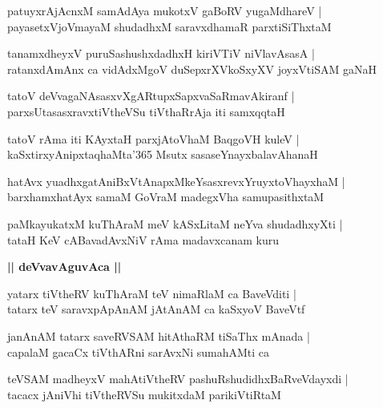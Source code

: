 \documentclass[twoside,12pt,openright]{book}
\newcounter{shloka}[chapter]
\def\uvaca#1{\centerline{{\large\textbf{#1}}}}
\begin{document}
\begin{shloka}%
patuyxrAjAcnxM samAdAya mukotxV gaBoRV yugaMdhareV |\\
payasetxVjoVmayaM shudadhxM saravxdhamaR parxtiSiThxtaM 
\end{shloka}

\begin{shloka}%
tanamxdheyxV puruSashushxdadhxH kiriVTiV niVlavAsasA |\\
ratanxdAmAnx ca vidAdxMgoV duSepxrXVkoSxyXV joyxVtiSAM gaNaH 
\end{shloka}

\begin{shloka}%
tatoV deVvagaNAsasxvXgARtupxSapxvaSaRmavAkiranf |\\
parxsUtasasxravxtiVtheVSu tiVthaRrAja iti samxqqtaH 
\end{shloka}

\begin{shloka}%
tatoV rAma iti KAyxtaH parxjAtoVhaM BaqgoVH kuleV |\\
kaSxtirxyAnipxtaqhaMta\char'365 Msutx sasaseYnayxbalavAhanaH 
\end{shloka}

\begin{shloka}%
hatAvx yuadhxgatAniBxVtAnapxMkeYsasxrevxYruyxtoVhayxhaM |\\
barxhamxhatAyx samaM GoVraM madegxVha samupasithxtaM 
\end{shloka}

\begin{shloka}%
paMkayukatxM kuThAraM meV kASxLitaM neYva shudadhxyXti |\\
tataH KeV cABavadAvxNiV rAma madavxcanam kuru 
\end{shloka}

\uvaca{|| deVvavAguvAca ||}

\begin{shloka}%
yatarx tiVtheRV kuThAraM teV nimaRlaM ca BaveVditi |\\
tatarx teV saravxpApAnAM jAtAnAM ca kaSxyoV BaveVtf
\end{shloka}

\begin{shloka}%
janAnAM tatarx saveRVSAM hitAthaRM tiSaThx mAnada |\\
capalaM gacaCx tiVthARni sarAvxNi sumahAMti ca 
\end{shloka}

\begin{shloka}%
teVSAM madheyxV mahAtiVtheRV pashuRshudidhxBaRveVdayxdi |\\
tacacx jAniVhi tiVtheRVSu mukitxdaM parikiVtiRtaM 
\end{shloka}
\end{document}
